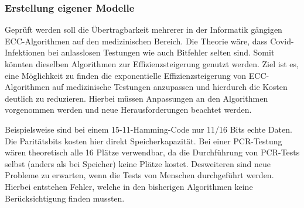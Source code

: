 \subsubsection{Erstellung eigener Modelle}
Geprüft werden soll die Übertragbarkeit mehrerer in der Informatik gängigen ECC-Algorithmen auf den medizinischen Bereich.
Die Theorie wäre, dass Covid-Infektionen bei anlasslosen Testungen wie auch Bitfehler selten sind.
Somit könnten dieselben Algorithmen zur Effizienzsteigerung genutzt werden.
Ziel ist es, eine Möglichkeit zu finden die exponentielle Effizienzsteigerung von ECC-Algorithmen auf medizinische Testungen anzupassen und hierdurch die Kosten deutlich zu reduzieren.
Hierbei müssen Anpassungen an den Algorithmen vorgenommen werden und neue Herausforderungen beachtet werden.

Beispielsweise sind bei einem 15-11-Hamming-Code nur 11/16 Bits echte Daten.
Die Paritätsbits kosten hier direkt Speicherkapazität.
Bei einer PCR-Testung wären theoretisch alle 16 Plätze verwendbar, da die Durchführung von PCR-Tests selbst (anders als bei Speicher) keine Plätze kostet.
Desweiteren sind neue Probleme zu erwarten, wenn die Tests von Menschen durchgeführt werden.
Hierbei entstehen Fehler, welche in den bisherigen Algorithmen keine Berücksichtigung finden mussten.

\fi